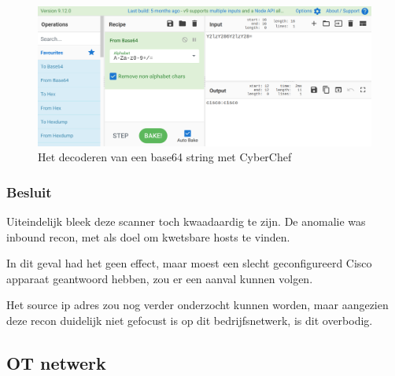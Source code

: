 \documentclass[a4paper,12pt]{report}
\begin{document}
\begin{figure}[H]
  \centering
  \includegraphics[width=\textwidth]{analyse-masscan-cyberchef}
  \caption{Het decoderen van een base64 string met CyberChef}
  \label{fig:analyse-masscan-cyberchef}
\end{figure}

\subsubsection{Besluit}
Uiteindelijk bleek deze scanner toch kwaadaardig te zijn.
De anomalie was inbound recon, met als doel om kwetsbare hosts te vinden.

In dit geval had het geen effect, maar moest een slecht geconfigureerd Cisco apparaat geantwoord hebben, zou er een aanval kunnen volgen.

Het source ip adres zou nog verder onderzocht kunnen worden, maar aangezien deze recon duidelijk niet gefocust is op dit bedrijfsnetwerk, is dit overbodig.


\subsection{OT netwerk}
\end{document}
